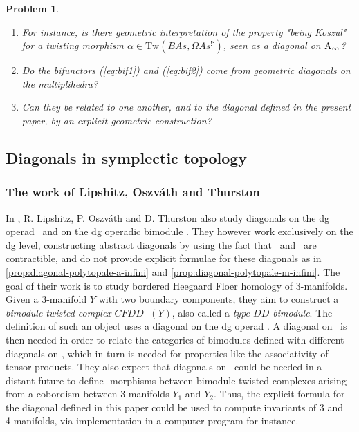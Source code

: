 \documentclass[twoside, 11pt]{amsart}
\newtheorem{problem}{Problem}
\theoremstyle{remark}
\begin{document}
\begin{problem}
\begin{enumerate}[leftmargin=*]
\item For instance, is there geometric interpretation of the property "being Koszul" for a twisting morphism $\alpha \in \mathrm{Tw}(B As,\Omega As^{\text{!`}})$, seen as a diagonal on $\mathrm{A}_\infty$? 
\item Do the bifunctors (\ref{eq:bif1}) and (\ref{eq:bif2}) come from geometric diagonals on the multiplihedra? 
\item Can they be related to one another, and to the diagonal defined in the present paper, by an explicit geometric construction?
\end{enumerate} 
\end{problem}

\subsection{Diagonals in symplectic topology} \label{ss:diag-symp}

\subsubsection{The work of Lipshitz, {Oszv\'ath} and Thurston}

In \cite{LOT20}, R. Lipshitz, P. Oszv\'ath and D. Thurston also study diagonals on the dg operad \Ainf\ and on the dg operadic bimodule \Minf . They however work exclusively on the dg level, constructing abstract diagonals by using the fact that \Ainf\ and \Minf\ are contractible, and do not provide explicit formulae for these diagonals as in \cref{prop:diagonal-polytopale-a-infini} and \cref{prop:diagonal-polytopale-m-infini}. The goal of their work is to study bordered Heegaard Floer homology of 3-manifolds.
Given a 3-manifold $Y$ with two boundary components, they aim to construct a \emph{bimodule twisted complex} $CFDD^-(Y)$, also called a \emph{type $DD$-bimodule}. The definition of such an object uses a diagonal on the dg operad \Ainf . A diagonal on \Minf\ is then needed in order to relate the categories of bimodules defined with different diagonals on \Ainf , which in turn is needed for properties like the associativity of tensor products. They also expect that diagonals on \Minf\ could be needed in a distant future to define \Ainf -morphisms between bimodule twisted complexes arising from a cobordism between 3-manifolds $Y_1$ and $Y_2$.
Thus, the explicit formula for the diagonal defined in this paper could be used to compute invariants of 3 and 4-manifolds, via implementation in a computer program for instance.
\end{document}
